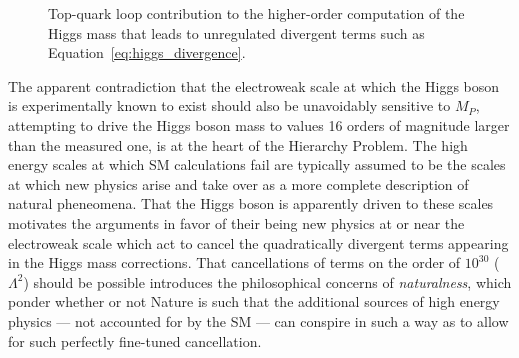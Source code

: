 \begin{description}
\begin{figure}[!htb]
\begin{minipage}{0.8\textwidth}
\begin{center}
                \caption{
                    Top-quark loop contribution to the higher-order computation of the Higgs mass that
                    leads to unregulated divergent terms such as Equation~\ref{eq:higgs_divergence}.
                }
                \label{fig:higgs_mass_correction}
            \end{center}
        \end{minipage}
        \end{figure}
        The apparent contradiction that the electroweak scale at which the Higgs boson is experimentally known to exist
        should also be unavoidably sensitive to $M_P$, attempting to drive the Higgs boson mass to values 16 orders
        of magnitude larger than the measured one,
        is at the heart of the Hierarchy Problem.
        The high energy scales at which SM calculations fail are typically assumed to be the scales
        at which new physics arise and take over as a more complete description of natural pheneomena.
        That the Higgs boson is apparently driven to these scales motivates the arguments in favor
        of their being new physics at or near the electroweak scale which act to cancel the quadratically
        divergent terms appearing in the Higgs mass corrections.
        That cancellations of terms on the order of $10^{30}$ ($\Lambda^2$) should be possible introduces the
        philosophical concerns of \textit{naturalness}, which ponder whether or not Nature is such
        that the additional sources of high energy physics --- not accounted for by the SM --- can conspire in such a way as to
        allow for such perfectly fine-tuned cancellation.
\end{description}

